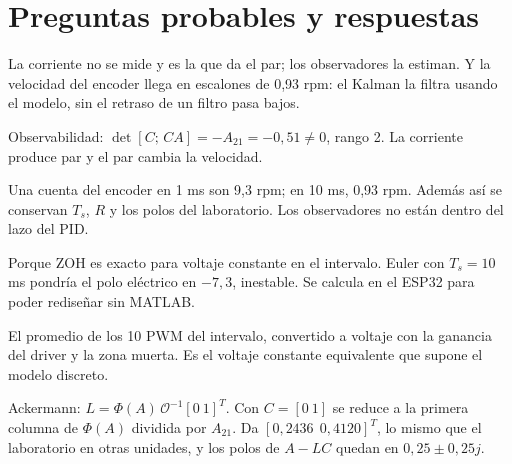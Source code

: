 \documentclass[11pt]{article}
\begin{document}
\section{Preguntas probables y respuestas}

\begin{preg}
La corriente no se mide y es la que da el par; los observadores la estiman. Y la velocidad del encoder llega en escalones de 0,93 rpm: el Kalman la filtra usando el modelo, sin el retraso de un filtro pasa bajos.
\end{preg}

\begin{preg}
Observabilidad: $\det[C;\,CA]=-A_{21}=-0{,}51\neq0$, rango 2. La corriente produce par y el par cambia la velocidad.
\end{preg}

\begin{preg}
Una cuenta del encoder en 1 ms son 9,3 rpm; en 10 ms, 0,93 rpm. Además así se conservan $T_s$, $R$ y los polos del laboratorio. Los observadores no están dentro del lazo del PID.
\end{preg}

\begin{preg}
Porque ZOH es exacto para voltaje constante en el intervalo. Euler con $T_s=10$ ms pondría el polo eléctrico en $-7{,}3$, inestable. Se calcula en el ESP32 para poder rediseñar sin MATLAB.
\end{preg}

\begin{preg}
El promedio de los 10 PWM del intervalo, convertido a voltaje con la ganancia del driver y la zona muerta. Es el voltaje constante equivalente que supone el modelo discreto.
\end{preg}

\begin{preg}
Ackermann: $L=\Phi(A)\,\mathcal O^{-1}[0\ 1]^T$. Con $C=[0\ 1]$ se reduce a la primera columna de $\Phi(A)$ dividida por $A_{21}$. Da $[0{,}2436\ \ 0{,}4120]^T$, lo mismo que el laboratorio en otras unidades, y los polos de $A-LC$ quedan en $0{,}25\pm0{,}25j$.
\end{preg}
\end{document}
